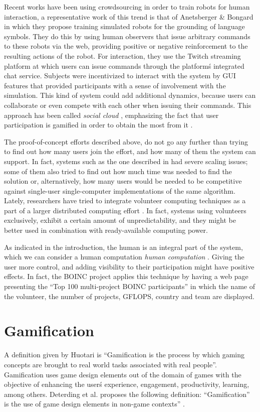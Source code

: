 \documentclass{llncs}
\begin{document}
Recent works have been using crowdsourcing in order to train robots
for human interaction, a representative work of this trend is that of
Anetsberger \& Bongard \cite{anetsbergerrobots} in which they propose
training simulated robots for the grounding of language symbols. They do this by using human observers that issue arbitrary commands to these robots via the web, providing positive or negative reinforcement to the resulting actions of the robot. For interaction, they use the Twitch streaming platform at which users can issue commands through the
platform\'s integrated chat service. Subjects were incentivized to
interact with the system by GUI features that provided participants
with a sense of involvement with the simulation. This kind of system
could add additional dynamics, because users can collaborate or
even compete with each other when issuing their commands. This approach has been called {\em social cloud} \cite{6404452}, emphasizing the fact that user participation is gamified in order to obtain the most from it \cite{7027564}.

The proof-of-concept efforts described above, do not go any further than trying to find out how many users join the effort, and how many of them the system can support. In fact, systems such as the one described in
\cite{gecco07:workshop:dcor} had severe scaling issues; some of them
also tried to find out how much time was needed to find the solution
or, alternatively, how many users would be needed to be competitive
against single-user single-computer implementations of the same
algorithm. Lately, researchers have tried to integrate volunteer computing techniques as a part of a larger distributed computing effort \cite{leclerc2016seamless}.  In fact, systems using volunteers exclusively, exhibit a certain amount of unpredictability, and they might be better used in combination with ready-available computing power.

As indicated in the introduction, the human is an integral part of the system, which we can consider a human computation {\em human computation} \cite{quinn2011human}. Giving the user more control, and adding visibility to their participation might have positive effects. In fact, the BOINC project applies this technique by having a web page presenting the ``Top 100 multi-project BOINC participants'' in which the name of the volunteer, the number of projects, GFLOPS, country and team are displayed.

\section{Gamification}
\label{sec:gamification}
A definition given by Huotari  \cite{huotari2012defining} is ``Gamification is
the process by which gaming concepts are brought to real world tasks associated with
real people''. Gamification uses game design elements out of the domain of games
with the objective of enhancing the user\'s experience, engagement, productivity,
learning, among others. Deterding et al. proposes the following definition:
 ``Gamification” is the use of game design elements in non-game contexts''
 \cite{deterding2011gamification}.
\end{document}
